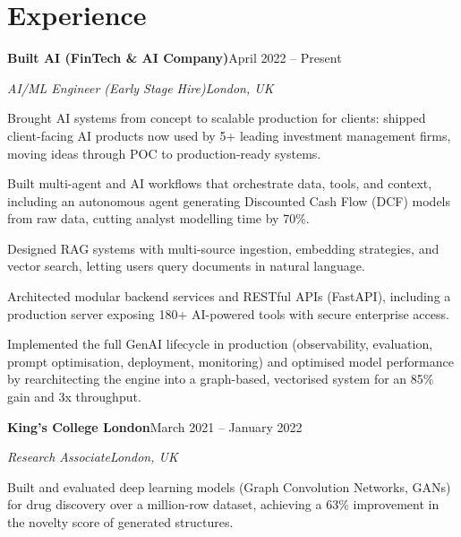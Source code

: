 \documentclass[10pt,a4paper]{article}
\newcommand{\entry}[4]{%
  {\color{company}\bfseries #1}\hfill {\color{muted}#2}\par
  \vspace{1pt}
  {\itshape #3}\hfill {\color{muted}\itshape #4}\par
  \vspace{3pt}%
}
\begin{document}
\section{Experience}
\entry{Built AI (FinTech \& AI Company)}{April 2022 -- Present}{AI/ML Engineer (Early Stage Hire)}{London, UK}
\begin{tight}
  \item Brought AI systems from concept to scalable production for clients: shipped client-facing AI products now used by 5+ leading investment management firms, moving ideas through POC to production-ready systems.
  \item Built multi-agent and AI workflows that orchestrate data, tools, and context, including an autonomous agent generating Discounted Cash Flow (DCF) models from raw data, cutting analyst modelling time by 70\%.
  \item Designed RAG systems with multi-source ingestion, embedding strategies, and vector search, letting users query documents in natural language.
  \item Architected modular backend services and RESTful APIs (FastAPI), including a production server exposing 180+ AI-powered tools with secure enterprise access.
  \item Implemented the full GenAI lifecycle in production (observability, evaluation, prompt optimisation, deployment, monitoring) and optimised model performance by rearchitecting the engine into a graph-based, vectorised system for an 85\% gain and 3x throughput.
\end{tight}

\entry{King's College London}{March 2021 -- January 2022}{Research Associate}{London, UK}
\begin{tight}
  \item Built and evaluated deep learning models (Graph Convolution Networks, GANs) for drug discovery over a million-row dataset, achieving a 63\% improvement in the novelty score of generated structures.
\end{tight}

\end{document}
